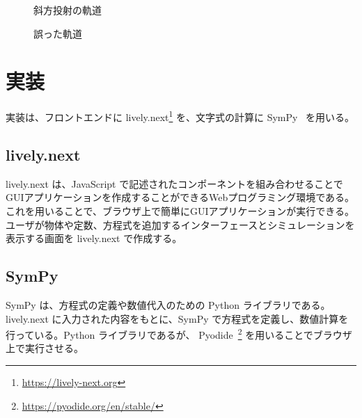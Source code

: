 \documentclass[11pt, a4paper, oneside, twocolumn, dvipdfmx]{jsarticle}
\begin{document}
\begin{figure}[htb]
\centering
\begin{minipage}{0.4\linewidth}
\centering
{}
\caption{斜方投射の軌道} \label{correct}
\end{minipage}
\begin{minipage}{0.4\linewidth}
\centering
{}
\caption{誤った軌道} \label{wrong}
\end{minipage}
\end{figure}

\section{実装} \label{sec3}
実装は、フロントエンドに lively.next\footnote{\url{https://lively-next.org}} を、文字式の計算に SymPy~\cite{meurer_sympy_2017} を用いる。

\subsection*{lively.next}
lively.next は、JavaScript で記述されたコンポーネントを組み合わせることでGUIアプリケーションを作成することができるWebプログラミング環境である。これを用いることで、ブラウザ上で簡単にGUIアプリケーションが実行できる。ユーザが物体や定数、方程式を追加するインターフェースとシミュレーションを表示する画面を lively.next で作成する。

\subsection*{SymPy}
SymPy は、方程式の定義や数値代入のための Python ライブラリである。lively.next に入力された内容をもとに、SymPy で方程式を定義し、数値計算を行っている。Python ライブラリであるが、 Pyodide~\footnote{\url{https://pyodide.org/en/stable/}} を用いることでブラウザ上で実行させる。
\end{document}
